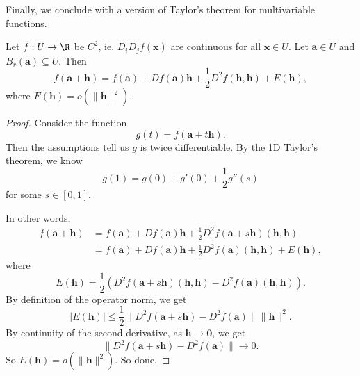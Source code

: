 \documentclass[a4paper]{article}
\begin{document}
Finally, we conclude with a version of Taylor's theorem for multivariable functions.

\begin{thm}
  Let $f: U \to \R$ be $C^2$, ie. $D_i D_j f(\mathbf{x})$ are continuous for all $\mathbf{x} \in U$. Let $\mathbf{a} \in U$ and $B_r(\mathbf{a}) \subseteq U$. Then
  \[
    f(\mathbf{a} + \mathbf{h}) = f(\mathbf{a}) + D f(\mathbf{a})\mathbf{h} + \frac{1}{2} D^2 f(\mathbf{h}, \mathbf{h}) + E(\mathbf{h}),
  \]
  where $E(\mathbf{h}) = o(\|\mathbf{h}\|^2)$.
\end{thm}

\begin{proof}
  Consider the function
  \[
    g(t) = f(\mathbf{a} + t\mathbf{h}).
  \]
  Then the assumptions tell us $g$ is twice differentiable. By the 1D Taylor's theorem, we know
  \[
    g(1) = g(0) + g'(0) + \frac{1}{2} g''(s)
  \]
  for some $s \in [0, 1]$.

  In other words,
  \begin{align*}
    f(\mathbf{a} + \mathbf{h}) &= f(\mathbf{a}) + Df(\mathbf{a}) \mathbf{h} + \frac{1}{2} D^2 f(\mathbf{a} + s \mathbf{h}) (\mathbf{h}, \mathbf{h})\\
    &= f(\mathbf{a}) + Df(\mathbf{a}) \mathbf{h} + \frac{1}{2} D^2 f(\mathbf{a}) (\mathbf{h}, \mathbf{h}) + E(\mathbf{h}),
  \end{align*}
  where
  \[
    E(\mathbf{h}) = \frac{1}{2}\left(D^2 f(\mathbf{a} + s \mathbf{h}) (\mathbf{h}, \mathbf{h}) - D^2 f(\mathbf{a}) (\mathbf{h}, \mathbf{h})\right).
  \]
  By definition of the operator norm, we get
  \[
    |E(\mathbf{h})| \leq \frac{1}{2} \|D^2 f(\mathbf{a} + s \mathbf{h}) - D^2 f(\mathbf{a})\| \|\mathbf{h}\|^2.
  \]
  By continuity of the second derivative, as $\mathbf{h} \to \mathbf{0}$, we get
  \[
    \|D^2 f(\mathbf{a} + s \mathbf{h}) - D^2 f(\mathbf{a})\| \to 0.
  \]
  So $E(\mathbf{h}) = o(\|\mathbf{h}\|^2)$. So done.
\end{proof}
\end{document}
